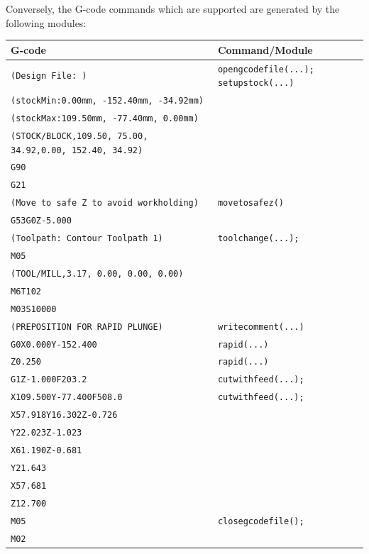 \documentclass{ltxdoc}
\begin{document}


\noindent Conversely, the G-code commands which are supported are generated by the following modules:

\bigskip

\noindent \begin{tabular}{@{}ll@{}} \toprule
 G-code                                                           & Command/Module \\ \midrule
 \verb|(Design File: )| &  \texttt{opengcodefile(...);}
                           \texttt{setupstock(...)}\\
 \verb|(stockMin:0.00mm, -152.40mm, -34.92mm)| \\
 \verb|(stockMax:109.50mm, -77.40mm, 0.00mm)| \\
 \verb|(STOCK/BLOCK,109.50, 75.00, 34.92,0.00, 152.40, 34.92)| \\
 \verb|G90| \\
 \verb|G21| \\ \midrule
 \verb|(Move to safe Z to avoid workholding)| &  \texttt{movetosafez()} \\
 \verb|G53G0Z-5.000| \\ \midrule
 \verb|(Toolpath: Contour Toolpath 1)| &  \texttt{toolchange(...);}\\
 \verb|M05| \\
 \verb|(TOOL/MILL,3.17, 0.00, 0.00, 0.00)| \\
 \verb|M6T102| \\
 \verb|M03S10000|  \\ \midrule
 \verb|(PREPOSITION FOR RAPID PLUNGE)| & \texttt{writecomment(...)}\\ \midrule
 \verb|G0X0.000Y-152.400| & \texttt{rapid(...)}\\
 \verb|Z0.250| & \texttt{rapid(...)}\\ \midrule
 \verb|G1Z-1.000F203.2| & \texttt{cutwithfeed(...);}\\  
 \verb|X109.500Y-77.400F508.0| & \texttt{cutwithfeed(...);} \\ 
 \verb|X57.918Y16.302Z-0.726|\\ 
 \verb|Y22.023Z-1.023|\\ 
 \verb|X61.190Z-0.681|\\ 
 \verb|Y21.643|\\ 
 \verb|X57.681|\\
 \verb|Z12.700|\\ \midrule
 \verb|M05| &  \texttt{closegcodefile();}\\
 \verb|M02|\\
 \bottomrule
 \end{tabular}
\bigskip
\end{document}
